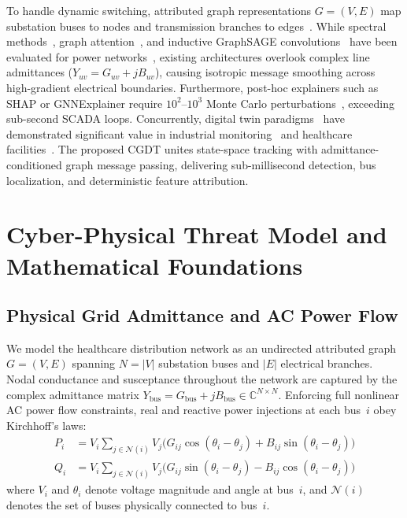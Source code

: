 \documentclass[runningheads]{llncs}
\begin{document}
To handle dynamic switching, attributed graph representations $G = (V, E)$ map substation buses to nodes and transmission branches to edges~\cite{sweeten2025cyber}.
While spectral methods~\cite{kipf2017semi}, graph attention~\cite{velickovic2018graph}, and inductive GraphSAGE convolutions~\cite{hamilton2017inductive} have been evaluated for power networks~\cite{boyaci2022joint,takiddin2023generalized,yue2024graph,luo2022detection}, existing architectures overlook complex line admittances ($Y_{uv} = G_{uv} + jB_{uv}$), causing isotropic message smoothing across high-gradient electrical boundaries.
Furthermore, post-hoc explainers such as SHAP or GNNExplainer require $10^2$--$10^3$ Monte Carlo perturbations~\cite{yuan2023explainability,ying2019gnnexplainer}, exceeding sub-second SCADA loops.
Concurrently, digital twin paradigms~\cite{grieves2017digital,tao2019digital} have demonstrated significant value in industrial monitoring~\cite{barreto2025cyber} and healthcare facilities~\cite{kamel2024digital}.
The proposed CGDT unites state-space tracking with admittance-conditioned graph message passing, delivering sub-millisecond detection, bus localization, and deterministic feature attribution.

\section{Cyber-Physical Threat Model and Mathematical Foundations}
\label{sec:threat}

\subsection{Physical Grid Admittance and AC Power Flow}

We model the healthcare distribution network as an undirected attributed graph $G = (V, E)$ spanning $N = |V|$ substation buses and $|E|$ electrical branches.
Nodal conductance and susceptance throughout the network are captured by the complex admittance matrix $Y_{\mathrm{bus}} = G_{\mathrm{bus}} + jB_{\mathrm{bus}} \in \mathbb{C}^{N \times N}$.
Enforcing full nonlinear AC power flow constraints, real and reactive power injections at each bus~$i$ obey Kirchhoff's laws:
\begin{align}
P_{i} &= V_{i} \sum_{j \in \mathcal{N}(i)} V_{j} \bigl( G_{ij} \cos(\theta_{i} - \theta_{j}) + B_{ij} \sin(\theta_{i} - \theta_{j}) \bigr) \label{eq:pflow} \\
Q_{i} &= V_{i} \sum_{j \in \mathcal{N}(i)} V_{j} \bigl( G_{ij} \sin(\theta_{i} - \theta_{j}) - B_{ij} \cos(\theta_{i} - \theta_{j}) \bigr) \label{eq:qflow}
\end{align}
where $V_{i}$ and $\theta_{i}$ denote voltage magnitude and angle at bus~$i$, and $\mathcal{N}(i)$ denotes the set of buses physically connected to bus~$i$.
\end{document}
